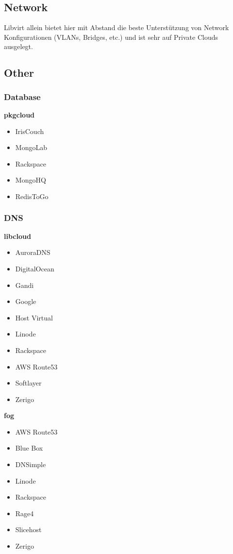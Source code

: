 \subsection{Network}
Libvirt allein bietet hier mit Abstand die beste Unterstützung von Network Konfigurationen 
(VLANs, Bridges, etc.) und ist sehr auf Private Clouds ausgelegt.\\


\subsection{Other}
\subsubsection{Database}
\textbf{pkgcloud}
\begin{multicols}{2}
\begin{itemize}
\item IrisCouch
\item MongoLab
\item Rackspace
\item MongoHQ
\item RedisToGo
\end{itemize}
\end{multicols}

\subsubsection{DNS}
\textbf{libcloud}
\begin{multicols}{2}
\begin{itemize}
\item AuroraDNS
\item DigitalOcean
\item Gandi
\item Google
\item Host Virtual
\item Linode
\item Rackspace
\item AWS Route53
\item Softlayer
\item Zerigo
\end{itemize}
\end{multicols}

\textbf{fog}
\begin{multicols}{2}
\begin{itemize}
\item AWS Route53
\item Blue Box
\item DNSimple
\item Linode
\item Rackspace
\item Rage4
\item Slicehost
\item Zerigo
\end{itemize}
\end{multicols}


